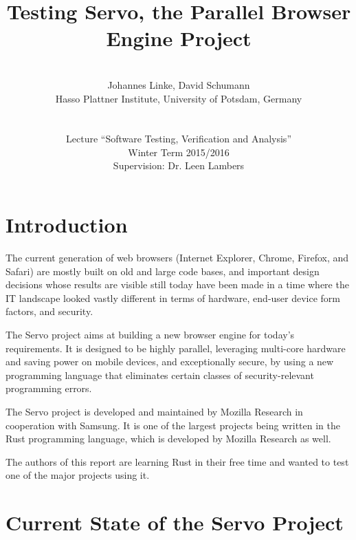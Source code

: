 \documentclass{scrartcl}
\begin{document}
\title{Testing Servo, the Parallel Browser Engine Project}
\author{\\ Johannes Linke, David Schumann\\ Hasso Plattner Institute, University of Potsdam, Germany\\ \\ \\
Lecture ``Software Testing, Verification and Analysis''\\ Winter Term 2015/2016\\ Supervision: Dr. Leen Lambers \vspace{320px}}

\maketitle
\thispagestyle{empty}

\newpage

\tableofcontents

\newpage



\section{Introduction}

The current generation of web browsers (Internet Explorer, Chrome, Firefox, and Safari) are mostly built on old and large code bases, and important design decisions whose results are visible still today have been made in a time where the IT landscape looked vastly different in terms of hardware, end-user device form factors, and security.

The Servo project aims at building a new browser engine for today's requirements. It is designed to be highly parallel, leveraging multi-core hardware and saving power on mobile devices, and exceptionally secure, by using a new programming language that eliminates certain classes of security-relevant programming errors.

The Servo project is developed and maintained by Mozilla Research in cooperation with Samsung. It is one of the largest projects being written in the Rust programming language, which is developed by Mozilla Research as well.

The authors of this report are learning Rust in their free time and wanted to test one of the major projects using it.


\newpage


\section{Current State of the Servo Project}
\end{document}
